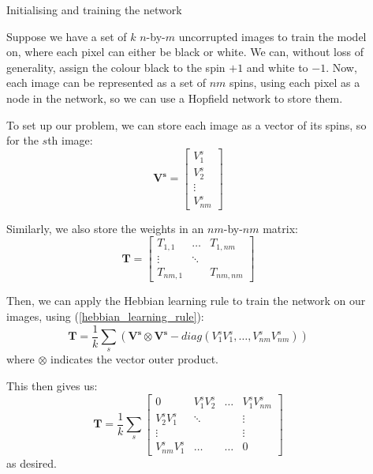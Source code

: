\documentclass[final]{beamer}
\newlength{\sepwidth}
\newlength{\colwidth}
\newcommand{\separatorcolumn}{\begin{column}{\sepwidth}\end{column}}
\begin{document}
\begin{frame}[t]
\begin{columns}[t]
\begin{column}{\colwidth}
\end{column}

\separatorcolumn

\begin{column}{\colwidth}

  \begin{block}{Initialising and training the network}

    Suppose we have a set of $k$ $n$-by-$m$ uncorrupted images to train the model on,
    where each pixel can either be black or white.
    We can, without loss of generality, assign the colour black to the spin $+1$
    and white to $-1$. Now, each image can be represented as a set of $nm$ spins, 
    using each pixel as a node in the network, so we can use a Hopfield network to 
    store them.

    To set up our problem, we can store each image as a vector of its spins, so for
    the $s$th image:
    \begin{equation*}
      \boldsymbol{V^s} = \begin{bmatrix}
        V^s_1 \\
        V^s_2 \\
        \vdots \\
        V^s_{nm}
      \end{bmatrix}
    \end{equation*}

    Similarly, we also store the weights in an $nm$-by-$nm$ matrix:
    \begin{equation*}
      \boldsymbol{T} = \begin{bmatrix}
        T_{1,1}   & \dots   & T_{1,nm}\\
        \vdots      & \ddots  & \\
        T_{nm,1}  &         & T_{nm,nm}
      \end{bmatrix}
    \end{equation*}

    Then, we can apply the Hebbian learning rule to train the network on our images, using
    (\ref{hebbian_learning_rule}):
    \begin{equation} \label{hebbian_simple_eq}
      \boldsymbol{T} = \frac{1}{k} \sum_{s}(\boldsymbol{V^s}\otimes\boldsymbol{V^s} - diag({V^s_1}{V^s_1}, \dots, {V^s_{nm}}{V^s_{nm}}))
    \end{equation}
    where $\otimes$ indicates the vector outer product.

    This then gives us:
    \begin{equation*}
      \boldsymbol{T} = \frac{1}{k} \sum_{s} \begin{bmatrix}
        0                 & {V^s_1}{V^s_2}  & \dots   & {V^s_1}{V^s_{nm}}\\
        {V^s_2}{V^s_1}    & \ddots          &         & \vdots \\
        \vdots            &                 &         & \vdots \\
        {V^s_{nm}}{V^s_1} & \dots           & \dots   & 0
      \end{bmatrix}
    \end{equation*}
    as desired.


\end{block}
\end{column}
\end{columns}
\end{frame}
\end{document}
